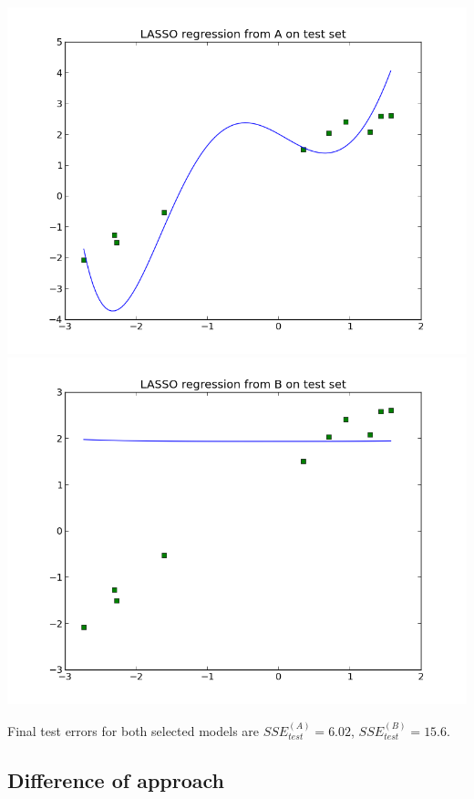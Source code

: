 \documentclass[twoside]{article}
\begin{document}
\begingroup
\centering
\includegraphics[scale=0.17]{./img/LASSO_test_A.png}
\includegraphics[scale=0.17]{./img/LASSO_test_B.png}
\endgroup

Final test errors for both selected models are $SSE_{test}^{(A)} = 6.02$, $SSE_{test}^{(B)} = 15.6$.

\subsection{Difference of approach}
\end{document}

